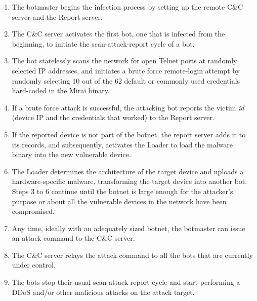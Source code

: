 \begin{enumerate}
    \item The botmaster begins the infection process by setting up the remote C\&C server and the Report server.
    \item The C\&C server activates the first bot, one that is infected from the beginning, to initiate the scan-attack-report cycle of a bot.
    \item The bot statelessly scans the network for open Telnet ports at randomly selected IP addresses, and initiates a brute force remote-login attempt by randomly selecting 10 out of the 62 default or commonly used credentials hard-coded in the Mirai binary.
    \item If a brute force attack is successful, the attacking bot reports the victim \emph{id} (device IP and the credentials that worked) to the Report server.
    \item If the reported device is not part of the botnet, the report server adds it to its records, and subsequently, activates the Loader to load the malware binary into the new vulnerable device.
    \item The Loader determines the architecture of the target device and uploads a hardware-specific malware, transforming the target device into another bot. Steps 3 to 6 continue until the botnet is large enough for the attacker's purpose or about all the vulnerable devices in the network have been compromised.
    \item Any time, ideally with an adequately sized botnet, the botmaster can issue an attack command to the C\&C server.
    \item The C\&C server relays the attack command to all the bots that are currently under control.
    \item The bots stop their usual scan-attack-report cycle and start performing a DDoS and/or other malicious attacks on the attack target.
\end{enumerate}



